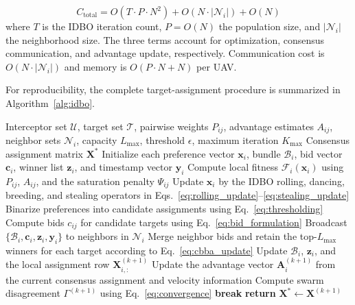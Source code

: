 \documentclass[lettersize,journal]{IEEEtran}
\begin{document}
\begin{equation}
\label{eq:complexity}
C_{\text{total}} = O(T \cdot P \cdot N^2) + O(N \cdot |\mathcal{N}_i|) + O(N)
\end{equation}
where $T$ is the IDBO iteration count, $P = O(N)$ the population size, and $|\mathcal{N}_i|$ the neighborhood size. The three terms account for optimization, consensus communication, and advantage update, respectively. Communication cost is $O(N \cdot |\mathcal{N}_i|)$ and memory is $O(P \cdot N + N)$ per UAV.

For reproducibility, the complete target-assignment procedure is summarized in
Algorithm~\ref{alg:idbo}.

\begin{algorithm}[!t]
\caption{Distributed Consensus-Based IDBO Target Assignment}
\label{alg:idbo}
\footnotesize
\begin{algorithmic}[1]
\REQUIRE Interceptor set $\mathcal{U}$, target set $\mathcal{T}$, pairwise weights $P_{ij}$,
advantage estimates $A_{ij}$, neighbor sets $\mathcal{N}_i$, capacity $L_{\max}$, threshold
$\epsilon$, maximum iteration $K_{\max}$
\ENSURE Consensus assignment matrix $\mathbf{X}^{*}$
\STATE Initialize each preference vector $\mathbf{x}_i$, bundle $\mathcal{B}_i$, bid vector
$\mathbf{c}_i$, winner list $\mathbf{z}_i$, and timestamp vector $\mathbf{y}_i$
        \STATE Compute local fitness $\mathcal{F}_i(\mathbf{x}_i)$ using $P_{ij}$,
        $A_{ij}$, and the saturation penalty $\Psi_{ij}$
        \STATE Update $\mathbf{x}_i$ by the IDBO rolling, dancing, breeding, and stealing
        operators in Eqs.~\eqref{eq:rolling_update}--\eqref{eq:stealing_update}
        \STATE Binarize preferences into candidate assignments using
        Eq.~\eqref{eq:thresholding}
        \STATE Compute bids $c_{ij}$ for candidate targets using Eq.~\eqref{eq:bid_formulation}
        \STATE Broadcast $\{\mathcal{B}_i,\mathbf{c}_i,\mathbf{z}_i,\mathbf{y}_i\}$ to
        neighbors in $\mathcal{N}_i$
        \STATE Merge neighbor bids and retain the top-$L_{\max}$ winners for each target
        according to Eq.~\eqref{eq:cbba_update}
        \STATE Update $\mathcal{B}_i$, $\mathbf{z}_i$, and the local assignment row
        $\mathbf{X}_{i,:}^{(k+1)}$
        \STATE Update the advantage vector $\mathbf{A}_i^{(k+1)}$ from the current consensus
        assignment and velocity information
    \ENDFOR
    \STATE Compute swarm disagreement $\Gamma^{(k+1)}$ using Eq.~\eqref{eq:convergence}
        \STATE \textbf{break}
    \ENDIF
\ENDFOR
\STATE \textbf{return} $\mathbf{X}^{*}\leftarrow\mathbf{X}^{(k+1)}$
\end{algorithmic}
\end{algorithm}
\end{document}
